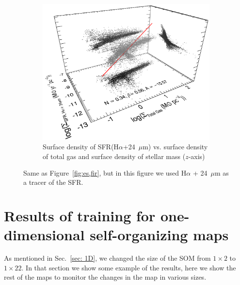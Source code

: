\begin{figure}
\begin{subfigure}[b]{0.5\textwidth}
        \label{fig:es,all,halpha,hi}
    \end{subfigure}
    \hfill
    \begin{subfigure}[b]{0.5\textwidth}
        \centering
        \includegraphics[width=\textwidth]{../image_paper1/es_tot_halpha_vs_tot2_f.png}
        \caption{Surface density of SFR(H$\alpha$+24~$\mu$m) vs. surface density of total gas and surface density of stellar mass ($z$-axis)}
        \label{fig:es,all,halpha,tot}
    \end{subfigure}
    \caption{Same as Figure~\ref{fig:es,fir}, but in this figure we used H$\alpha$ + 24~$\mu$m as a tracer of the SFR.}
\end{figure}


\section{Results of training for one-dimensional self-organizing maps}
\label{app: high_Z_1d_soms}
As mentioned in Sec.~\ref{sec: 1D}, we changed the size of the SOM from $1\times2$ to $1\times22$. In that section we show some example of the results, here we show the rest of the maps to monitor the changes in the map in various sizes.

